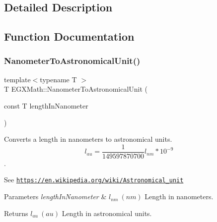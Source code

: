\subsection{Detailed Description}


\subsection{Function Documentation}
\mbox{\label{group___e_g_x_math-_conversions-_length_conversions-_nanometer-_astronomical_gab45f259430dc605beef983b095325ce1}} 
\subsubsection{\texorpdfstring{Nanometer\+To\+Astronomical\+Unit()}{NanometerToAstronomicalUnit()}}
{\footnotesize\ttfamily template$<$typename T $>$ \\
T E\+G\+X\+Math\+::\+Nanometer\+To\+Astronomical\+Unit (\begin{DoxyParamCaption}\item[{const T}]{length\+In\+Nanometer }\end{DoxyParamCaption})}



Converts a length in nanometers to astronomical units. \[ l_{au}= \frac{1}{149597870700} l_{nm} * 10^{-9} \]. 

See \href{https://en.wikipedia.org/wiki/Astronomical_unit}{\tt https\+://en.\+wikipedia.\+org/wiki/\+Astronomical\+\_\+unit} 
\begin{DoxyParams}{Parameters}
{\em length\+In\+Nanometer} & $ l_{nm}\ (nm)$ Length in nanometers. \\
\hline
\end{DoxyParams}
\begin{DoxyReturn}{Returns}
$ l_{au}\ (au)$ Length in astronomical units. 
\end{DoxyReturn}
\mbox{\label{group___e_g_x_math-_conversions-_length_conversions-_nanometer-_astronomical_ga9ef3d82e1ccb8e07dfb52500ff447b17}} 
